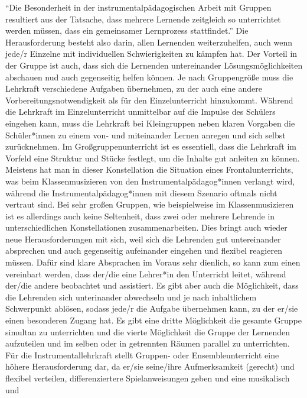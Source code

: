 \enquote{Die Besonderheit in der instrumentalpädagogischen Arbeit mit Gruppen
resultiert aus der Tatsache, dass mehrere Lernende zeitgleich so unterrichtet
werden müssen, dass ein gemeinsamer Lernprozess stattfindet.}
\autocite[221]{busch:grundwissen_instrumentalpaedagogik} Die Herausforderung
besteht also darin, allen Lernenden weiterzuhelfen, auch wenn jede/r Einzelne
mit individuellen Schwierigkeiten zu kämpfen hat. Der Vorteil in der Gruppe ist
auch, dass sich die Lernenden untereinander Lösungsmöglichkeiten abschauen
nud auch gegenseitig helfen können. Je nach Gruppengröße muss die Lehrkraft
verschiedene Aufgaben übernehmen, zu der auch eine andere
Vorbereitungsnotwendigkeit als für den Einzelunterricht hinzukommt. Während die
Lehrkraft im Einzelunterricht unmittelbar auf die Impulse des Schülers eingehen
kann, muss die Lehrkraft bei Kleingruppen neben klaren Vorgaben die
Schüler*innen zu einem von- und miteinander Lernen anregen und sich selbst
zurücknehmen. Im Großgruppenunterricht ist es essentiell, dass die
Lehrkraft im Vorfeld eine Struktur und Stücke festlegt, um die Inhalte gut
anleiten zu können.\autocite[220]{busch:grundwissen_instrumentalpaedagogik}
Meistens hat man in dieser Konstellation die Situation eines Frontalunterrichts,
was beim Klassenmusizieren von den Instrumentalpädagog*innen verlangt wird,
während die Instrumentalpädagog*innen mit diesem Szenario oftmals nicht vertraut
sind. Bei sehr großen Gruppen, wie beispielweise im Klassenmusizieren ist es
allerdings auch keine Seltenheit, dass zwei oder mehrere Lehrende in
unterschiedlichen Konstellationen zusammenarbeiten. Dies bringt auch wieder neue
Herausforderungen mit sich, weil sich die Lehrenden gut untereinander absprechen
und auch gegenseitig aufeinander eingehen und flexibel reagieren müssen. Dafür
sind klare Absprachen im Voraus sehr dienlich, so kann zum einen vereinbart
werden, dass der/die eine Lehrer*in den Unterricht leitet, während der/die
andere beobachtet und assistiert. Es gibt aber auch die Möglichkeit, dass die
Lehrenden sich unterinander abwechseln und je nach inhaltlichem Schwerpunkt
ablösen, sodass jede/r die Aufgabe übernehmen kann, zu der er/sie einen
besonderen Zugang hat. Es gibt eine dritte Möglichkeit die gesamte Gruppe
simultan zu unterrichten und die vierte Möglichkeit die Gruppe der Lernenden
aufzuteilen und im selben oder in getrennten Räumen parallel zu unterrichten.
Für die Instrumentallehrkraft stellt Gruppen- oder Ensembleunterricht eine höhere
Herausforderung dar, da er/sie seine/ihre Aufmerksamkeit (gerecht) und flexibel
verteilen, differenziertere Spielanweisungen geben und eine musikalisch und
